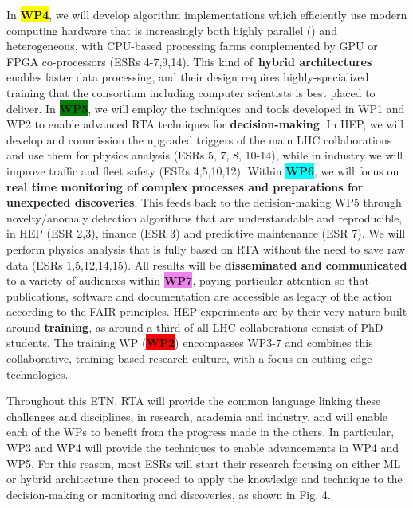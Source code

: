 In \textbf{\colorbox{yellow}{WP4}}, we will develop algorithm implementations which efficiently use modern computing hardware that is increasingly both highly parallel (\ESRc) and heterogeneous, with CPU-based processing farms complemented by GPU or FPGA co-processors (ESRs 4-7,9,14). 
This kind of~\textbf{hybrid architectures} enables faster data processing, and their design requires highly-specialized training that the consortium including computer scientists is best placed to deliver. 
In \textbf{\colorbox{green}{WP5}}, we will employ the techniques and tools developed in WP1 and WP2 to enable advanced RTA techniques for \textbf{decision-making}. In HEP, we will develop and commission the upgraded triggers of the main LHC collaborations and use them for physics analysis (ESRs 5, 7, 8, 10-14), while in industry we will improve traffic and fleet safety (ESRs 4,5,10,12). 
Within \textbf{\colorbox{cyan}{WP6}}, we will focus on \textbf{real time monitoring of complex processes and preparations for unexpected discoveries}. This feeds back to the decision-making WP5 through novelty/anomaly detection algorithms that are understandable and reproducible, in HEP (ESR 2,3), finance (ESR 3) and predictive maintenance (ESR 7). We will perform physics analysis that is fully based on RTA without the need to save raw data (ESRs 1,5,12,14,15). 
All results will be \textbf{disseminated and communicated} to a variety of audiences within \textbf{\colorbox{violet}{\color{white}WP7\color{black}}}, paying particular attention so that publications, software and documentation are accessible as legacy of the action according to the FAIR principles. 
HEP experiments are by their very nature built around \textbf{training}, as around a third of all LHC collaborations consist of PhD students. The training WP (\textbf{\colorbox{red}{WP2}}) encompasses WP3-7 and combines this collaborative, training-based research culture, with a focus on cutting-edge technologies. 

Throughout this ETN, RTA will provide the common language linking these challenges and disciplines, in research, academia and industry, and will enable each of the WPs to benefit from the progress made in the others. In particular, WP3 and WP4 will provide the techniques to enable advancements in WP4 and WP5. For this reason, most ESRs will start their research focusing on either ML or hybrid architecture then proceed to apply the knowledge and technique to the decision-making or monitoring and discoveries, as shown in Fig. 4. 

